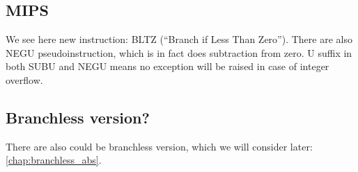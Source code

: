 \ifdefined\IncludeMIPS
\subsection{MIPS}



We see here new instruction: BLTZ (``Branch if Less Than Zero'').
There are also NEGU pseudoinstruction, which is in fact does subtraction from zero.
U suffix in both SUBU and NEGU means no exception will be raised in case of integer overflow.

\fi

\subsection{Branchless version?}

There are also could be branchless version, which we will consider later: \ref{chap:branchless_abs}.

\fi
